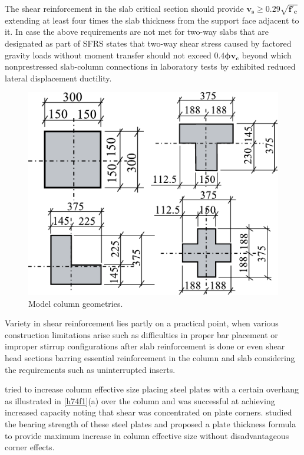 The shear reinforcement in the slab critical section should provide $\mathbf{v_s\ge0.29\sqrt{f'_c}}$ extending at least four times the slab thickness from the support face adjacent to it. In case the above requirements are not met for two-way slabs that are designated as part of SFRS \citet[Section 18.4.5.8]{aci31819} states that two-way shear stress caused by factored gravity loads without moment transfer should not exceed $\mathbf{0.4\phi v_c}$ beyond which nonprestressed slab-column connections in laboratory tests by \cite{pan1989} exhibited reduced lateral displacement ductility. 
\begin{figure}\centering
    \includegraphics[width=\columnwidth]{Figures/akt1.pdf}\caption{Model column geometries\citep{akinpelu2023}.}\label{akt1}
    \end{figure}

Variety in shear reinforcement lies partly on a practical point, when various construction limitations arise such as difficulties in proper bar placement or improper stirrup configurations after slab reinforcement is done or even shear head sections barring essential reinforcement in the column and slab considering the \cite{ACI31814} requirements such as uninterrupted inserts. 

\cite{moe1961} tried to increase column effective size placing steel plates with a certain overhang as illustrated in \ref{h74f1}(a) over the column and was successful at achieving increased capacity noting that shear was concentrated on plate corners. \cite{hawkins1968} studied the bearing strength of these steel plates and proposed a plate thickness formula to provide maximum increase in column effective size without disadvantageous corner effects. 

